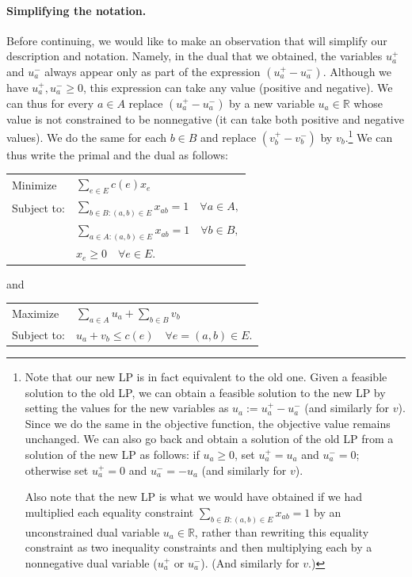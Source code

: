 \paragraph{Simplifying the notation.} Before continuing, we would like to make an observation that
will simplify our description and notation. Namely, in the dual that we obtained, the variables
$u_a^+$ and $u_a^-$ always appear only as part of the expression $(u_a^+-u_a^-)$. Although we have
$u_a^+,u_a^-\ge 0$, this expression can take any value (positive and negative). We can thus for
every $a\in A$ replace $(u_a^+-u_a^-)$ by a new variable $u_a\in\mathbb{R}$ whose value is not
constrained to be nonnegative (it can take both positive and negative values). We do the same for
each $b\in B$ and replace $(v_b^+-v_b^-)$ by $v_b$.\footnote{Note that our new LP is in fact
equivalent to the old one. Given a feasible solution to the old LP, we can obtain a feasible
solution to the new LP by setting the values for the new variables as $u_a:=u_a^+-u_a^-$ (and
similarly for $v$). Since we do the same in the objective function, the objective value remains
unchanged. We can also go back and obtain a solution of the old LP from a solution of the new LP
as follows: if $u_a\ge 0$, set $u_a^+=u_a$ and $u_a^-=0$; otherwise set $u_a^+=0$ and
$u_a^-=-u_a$ (and similarly for $v$).

\par\smallskip
Also note that the new LP is what we would have obtained if we had multiplied each equality
constraint $\sum_{b\in B:(a,b)\in E}x_{ab}=1$ by an unconstrained dual variable $u_a\in\mathbb{R}$,
rather than rewriting this equality constraint as two inequality constraints and then multiplying
each by a nonnegative dual variable ($u_a^+$ or $u_a^-$). (And similarly for $v$.)} We can thus
write the primal and the dual as follows:
\begin{center}
\begin{tabular}{ll}
  Minimize    & $\displaystyle\sum_{e\in E}c(e)x_e$\\[8pt]
  Subject to: & $\displaystyle\sum_{b\in B:(a,b)\in E}x_{ab}=1\quad\forall a\in A,$\\[8pt]
              & $\displaystyle\sum_{a\in A:(a,b)\in E}x_{ab}=1\quad\forall b\in B,$\\[8pt]
              & $x_e\ge 0\quad\forall e\in E.$
\end{tabular}
\end{center}
and
\begin{center}
\begin{tabular}{ll}
  Maximize    & $\displaystyle\sum_{a\in A}u_a+\sum_{b\in B}v_b$\\[8pt]
  Subject to: & $u_a+v_b\le c(e)\quad\forall e=(a,b)\in E.$
\end{tabular}
\end{center}
